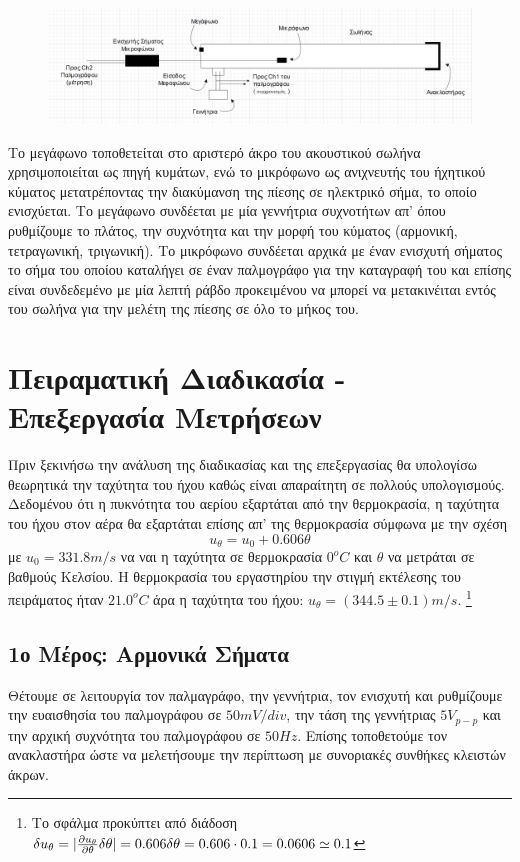 \documentclass[a4paper]{article}
\begin{document}
\begin{figure}[h!]
\centering
\includegraphics[scale=0.5]{setup.png}
\end{figure}

Το μεγάφωνο τοποθετείται στο αριστερό άκρο του ακουστικού σωλήνα χρησιμοποιείται ως πηγή κυμάτων, ενώ το μικρόφωνο ως ανιχνευτής του ήχητικού κύματος μετατρέποντας την διακύμανση της πίεσης σε ηλεκτρικό σήμα, το οποίο ενισχύεται. Το μεγάφωνο συνδέεται με μία γεννήτρια συχνοτήτων απ' όπου ρυθμίζουμε το πλάτος, την συχνότητα και την μορφή του κύματος  (αρμονική, τετραγωνική, τριγωνική). Το μικρόφωνο συνδέεται αρχικά με έναν ενισχυτή σήματος το σήμα του οποίου καταλήγει σε έναν παλμογράφο για την καταγραφή του και επίσης είναι συνδεδεμένο με μία λεπτή ράβδο προκειμένου να μπορεί να μετακινέιται εντός του σωλήνα για την μελέτη της πίεσης σε όλο το μήκος του. 
\newline\
\section*{Πειραματική Διαδικασία - Επεξεργασία Μετρήσεων}
Πριν ξεκινήσω την ανάλυση της διαδικασίας και της επεξεργασίας θα υπολογίσω θεωρητικά την ταχύτητα του ήχου καθώς είναι απαραίτητη σε πολλούς υπολογισμούς. Δεδομένου ότι η πυκνότητα του αερίου εξαρτάται από την θερμοκρασία, η ταχύτητα του ήχου στον αέρα θα εξαρτάται επίσης απ' της θερμοκρασία σύμφωνα με την σχέση 
\begin{equation}\label{5}
u_{\theta} = u_0 + 0.606\theta
\end{equation}
με $u_0=331.8m/s$ να ναι η ταχύτητα σε θερμοκρασία $0^oC$ και $\theta$ να μετράται σε βαθμούς Κελσίου. Η θερμοκρασία του εργαστηρίου την στιγμή εκτέλεσης του πειράματος ήταν $21.0^oC$ άρα η ταχύτητα του ήχου: $u_{\theta} = (344.5 \pm 0.1)m/s$.
\footnote{Το σφάλμα προκύπτει από διάδοση $\delta u_{\theta} = | \pdv{u_{\theta}}{\theta} \delta\theta | = 0.606\delta\theta =0.606\cdot 0.1 = 0.0606\simeq 0.1$}
\subsection*{1ο Μέρος: Αρμονικά Σήματα}
Θέτουμε σε λειτουργία τον παλμαγράφο, την γεννήτρια, τον ενισχυτή και ρυθμίζουμε την ευαισθησία του παλμογράφου σε $50mV/div$, την τάση της γεννήτριας $5V_{p-p}$ και την αρχική συχνότητα του παλμογράφου σε $50Hz$. Επίσης τοποθετούμε τον ανακλαστήρα ώστε να μελετήσουμε την περίπτωση με συνοριακές συνθήκες κλειστών άκρων. 
\end{document}
